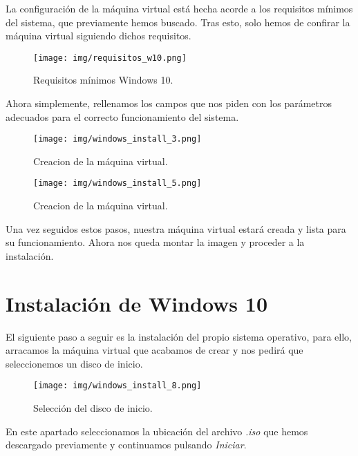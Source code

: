 \documentclass[12pt]{article}
\begin{document}
      La configuración de la máquina virtual está hecha acorde a los requisitos mínimos del sistema, que previamente hemos 
      buscado. Tras esto, solo hemos de confirar la máquina virtual siguiendo dichos requisitos.

      \begin{figure}[h]
        \centering
        \texttt{[image: img/requisitos\_w10.png]}
        \caption{Requisitos mínimos Windows 10.}
        \label{requisitos}
      \end{figure}

      \newpage

      Ahora simplemente, rellenamos los campos que nos piden con los parámetros adecuados para el correcto 
      funcionamiento del sistema.

      \begin{figure}[h]
        \centering
        \texttt{[image: img/windows\_install\_3.png]}
        \caption{Creacion de la máquina virtual.}
        \label{Windows2}
      \end{figure}

      \begin{figure}[h]
        \centering
        \texttt{[image: img/windows\_install\_5.png]}
        \caption{Creacion de la máquina virtual.}
        \label{Windows3}
      \end{figure}
    
      Una vez seguidos estos pasos, nuestra máquina virtual estará creada y lista para su funcionamiento. Ahora 
      nos queda montar la imagen y proceder a la instalación.
    
      \newpage

    \section{Instalación de Windows 10}

      El siguiente paso a seguir es la instalación del propio sistema operativo, para ello, arracamos la máquina 
      virtual que acabamos de crear y nos pedirá que seleccionemos un disco de inicio.

      \begin{figure}[h]
        \centering
        \texttt{[image: img/windows\_install\_8.png]}
        \caption{Selección del disco de inicio.}
        \label{Windows4}
      \end{figure}

      En este apartado seleccionamos la ubicación del archivo \textit{.iso} que hemos descargado previamente y 
      continuamos pulsando \textit{Iniciar}.
\end{document}
